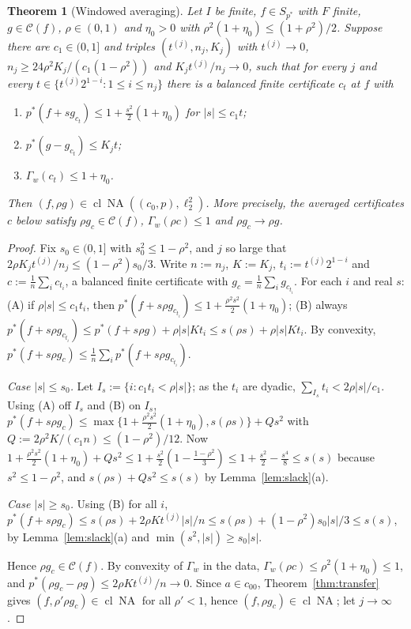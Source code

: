 \documentclass[10pt]{amsart}
\newtheorem{theorem}{Theorem}[section]
\theoremstyle{definition}
\theoremstyle{remark}
\newcommand{\NA}{\operatorname{NA}}
\newcommand{\Cset}{\mathcal C}
\newcommand{\cl}{\operatorname{cl}}
\begin{document}
\begin{theorem}[Windowed averaging]\label{thm:windowed}
Let $I$ be finite, $f\in S_{p^*}$ with $F$ finite, $g\in\Cset(f)$,
$\rho\in(0,1)$ and $\eta_0>0$ with $\rho^2(1+\eta_0)\le(1+\rho^2)/2$.
Suppose there are $c_1\in(0,1]$ and triples $(t^{(j)},n_j,K_j)$ with
$t^{(j)}\to0$, $n_j\ge24\rho^2K_j/(c_1(1-\rho^2))$ and
$K_jt^{(j)}/n_j\to0$, such that for every $j$ and every
$t\in\{t^{(j)}2^{1-i}:1\le i\le n_j\}$ there is a balanced finite
certificate $c_t$ at $f$ with
\begin{enumerate}
\item[(i)] $p^*(f+sg_{c_t})\le1+\frac{s^2}2(1+\eta_0)$ for $|s|\le c_1t$;
\item[(ii)] $p^*(g-g_{c_t})\le K_jt$;
\item[(iii)] $\Gamma_w(c_t)\le1+\eta_0$.
\end{enumerate}
Then $(f,\rho g)\in\cl\NA((c_0,p),\ell_2^2)$.  More precisely, the averaged
certificates $c$ below satisfy $\rho g_c\in\Cset(f)$, $\Gamma_w(\rho c)\le1$
and $\rho g_c\to\rho g$.
\end{theorem}

\begin{proof}
Fix $s_0\in(0,1]$ with $s_0^2\le1-\rho^2$, and $j$ so large that
$2\rho K_jt^{(j)}/n_j\le(1-\rho^2)s_0/3$.  Write $n:=n_j$, $K:=K_j$,
$t_i:=t^{(j)}2^{1-i}$ and $c:=\frac1n\sum_ic_{t_i}$, a balanced finite
certificate with $g_c=\frac1n\sum_ig_{c_{t_i}}$.  For each $i$ and real $s$:
(A) if $\rho|s|\le c_1t_i$, then $p^*(f+s\rho g_{c_{t_i}})\le1+
\frac{\rho^2s^2}2(1+\eta_0)$; (B) always $p^*(f+s\rho g_{c_{t_i}})\le
p^*(f+s\rho g)+\rho|s|Kt_i\le s(\rho s)+\rho|s|Kt_i$.  By convexity,
$p^*(f+s\rho g_c)\le\frac1n\sum_ip^*(f+s\rho g_{c_{t_i}})$.

\emph{Case $|s|\le s_0$.}  Let $I_s:=\{i:c_1t_i<\rho|s|\}$; as the $t_i$ are
dyadic, $\sum_{I_s}t_i<2\rho|s|/c_1$.  Using (A) off $I_s$ and (B) on $I_s$,
$p^*(f+s\rho g_c)\le\max\{1+\frac{\rho^2s^2}2(1+\eta_0),s(\rho s)\}+Qs^2$
with $Q:=2\rho^2K/(c_1n)\le(1-\rho^2)/12$.  Now
$1+\frac{\rho^2s^2}2(1+\eta_0)+Qs^2\le1+\frac{s^2}2(1-\frac{1-\rho^2}3)\le
1+\frac{s^2}2-\frac{s^4}8\le s(s)$ because $s^2\le1-\rho^2$, and
$s(\rho s)+Qs^2\le s(s)$ by Lemma~\ref{lem:slack}(a).

\emph{Case $|s|\ge s_0$.}  Using (B) for all $i$, $p^*(f+s\rho g_c)\le
s(\rho s)+2\rho Kt^{(j)}|s|/n\le s(\rho s)+(1-\rho^2)s_0|s|/3\le s(s)$, by
Lemma~\ref{lem:slack}(a) and $\min(s^2,|s|)\ge s_0|s|$.

Hence $\rho g_c\in\Cset(f)$.  By convexity of $\Gamma_w$ in the data,
$\Gamma_w(\rho c)\le\rho^2(1+\eta_0)\le1$, and $p^*(\rho g_c-\rho g)\le
2\rho Kt^{(j)}/n\to0$.  Since $a\in c_{00}$, Theorem~\ref{thm:transfer}
gives $(f,\rho'\rho g_c)\in\cl\NA$ for all $\rho'<1$, hence
$(f,\rho g_c)\in\cl\NA$; let $j\to\infty$.
\end{proof}
\end{document}
